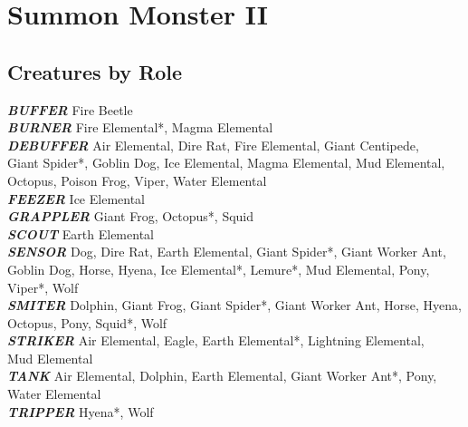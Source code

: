 \newpage

\def \levelnminusonenumsummons{1d3}
\def \levelnnumsummons{1}

\chapter{Summon Monster II}
\newpage

\section{Creatures by Role}

\vspace{5pt}

\textbf{\textit{BUFFER}} Fire Beetle \\

\textbf{\textit{BURNER}} Fire Elemental*, Magma Elemental \\

\textbf{\textit{DEBUFFER}} Air Elemental, Dire Rat, Fire Elemental, Giant Centipede, \\ Giant Spider*, Goblin Dog, Ice Elemental, Magma Elemental, Mud Elemental, Octopus, Poison Frog, Viper, Water Elemental \\

\textbf{\textit{FEEZER}} Ice Elemental \\

\textbf{\textit{GRAPPLER}} Giant Frog, Octopus*, Squid \\

\textbf{\textit{SCOUT}} Earth Elemental \\

\textbf{\textit{SENSOR}} Dog, Dire Rat, Earth Elemental, Giant Spider*, Giant Worker Ant, Goblin Dog, Horse, Hyena, Ice Elemental*, Lemure*, Mud Elemental, Pony, Viper*, Wolf \\

\textbf{\textit{SMITER}} Dolphin, Giant Frog, Giant Spider*, Giant Worker Ant, Horse, Hyena, Octopus, Pony, Squid*, Wolf \\

\textbf{\textit{STRIKER}} Air Elemental, Eagle, Earth Elemental*, Lightning Elemental, \\ Mud Elemental \\

\textbf{\textit{TANK}} Air Elemental, Dolphin, Earth Elemental, Giant Worker Ant*,  Pony, Water Elemental \\

\textbf{\textit{TRIPPER}} Hyena*, Wolf  \\

